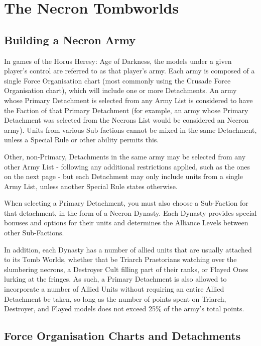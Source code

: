 \section{The Necron Tombworlds}


\subsection{Building a Necron Army}

In games of the Horus Heresy: Age of Darkness, the models under a given player’s control are referred to as that player’s army. Each army is composed of a single Force Organisation chart (most commonly using the Crusade Force Organisation chart), which will include one or more Detachments. An army whose Primary Detachment is selected from any Army List is considered to have the Faction of that Primary Detachment (for example, an army whose Primary Detachment was selected from the Necrons List would be considered an Necron army). Units from various Sub-factions cannot be mixed in the same Detachment, unless a Special Rule or other ability permits this.

Other, non-Primary, Detachments in the same army may be selected from any other Army List - following any additional restrictions applied, such as the ones on the next page - but each Detachment may only include units from a single Army List, unless another Special Rule states otherwise.

When selecting a Primary Detachment, you must also choose a Sub-Faction for that detachment, in the form of a Necron Dynasty. Each Dynasty provides special bonuses and options for their units and determines the Alliance Levels between other Sub-Factions.

In addition, each Dynasty has a number of allied units that are usually attached to its Tomb Worlds, whether that be Triarch Praetorians watching over the slumbering necrons, a Destroyer Cult filling part of their ranks, or Flayed Ones lurking at the fringes. As such, a Primary Detachment is also allowed to incorporate a number of Allied Units without requiring an entire Allied Detachment be taken, so long as the number of points spent on Triarch, Destroyer, and Flayed models does not exceed 25\% of the army's total points.

\newpage
\subsection{Force Organisation Charts and Detachments}

